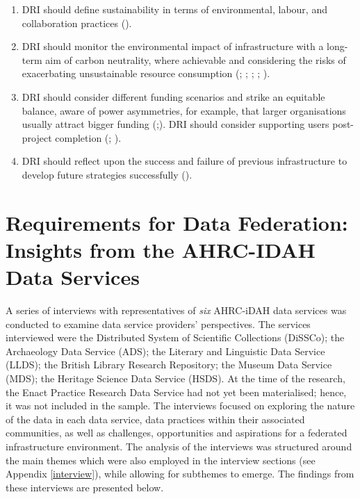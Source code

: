\documentclass[11pt]{scrartcl}
\begin{document}
\begin{enumerate}[resume]
\item DRI should define sustainability in terms of environmental, labour, and collaboration practices 
(\cite[1]{ross_2024_13710266}).   

\item DRI should monitor the environmental impact of infrastructure with a long-term aim of carbon neutrality, where achievable and considering the risks of exacerbating unsustainable resource consumption 
(\cite[7]{bell_2025_17099176}; \cite[13]{Black19102024}; \cite[29]{ross_2024_13710266}; \cite[21]{Zwiggelaar22}; \cite[2]{hawkins_2024_14006955}).  

\item DRI should consider different funding scenarios and 
strike an equitable balance, aware of power asymmetries, for example, that larger organisations usually attract bigger funding 
(\cite[21]{romanova_2021_5105938};\cite{duran_del_fierro_2025_17641455}). 
DRI should consider supporting users post-project completion
(\cite[14]{de_roure_2022_4716148}; \cite[41]{taylor_2022_10518740}). 
 

\item DRI should reflect upon the success and failure of previous infrastructure to develop future strategies successfully 
(\cite[21]{romanova_2021_5105938}).

\end{enumerate}
\section{Requirements for Data Federation: Insights from the AHRC-IDAH Data Services}
A series of interviews with representatives of \emph{six} AHRC-iDAH data services was conducted to examine data service providers' perspectives. The services interviewed were the Distributed System of Scientific Collections (DiSSCo); the Archaeology Data Service (ADS); the Literary and Linguistic Data Service (LLDS); the British Library Research Repository; the Museum Data Service (MDS); the Heritage Science Data Service (HSDS). At the time of the research, the Enact Practice Research Data Service had not yet been materialised; hence, it was not included in the sample. 
The interviews focused on exploring the nature of the data in each data service, data practices within their associated communities, as well as challenges, opportunities and aspirations for a federated infrastructure environment.  The analysis of the interviews was structured around the main themes which were also employed in the interview sections (see Appendix \ref{interview}), while allowing for subthemes to emerge. The findings from these interviews are presented below.
\end{document}
